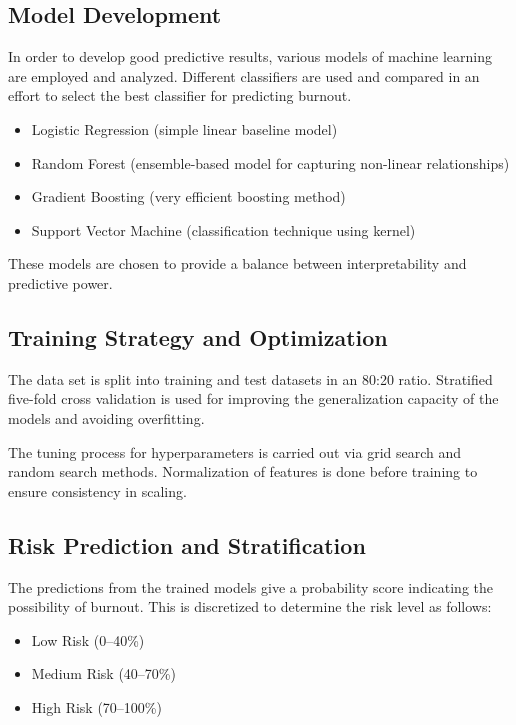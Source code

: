 \subsection{Model Development}

In order to develop good predictive results, various models of machine learning are employed and analyzed. Different classifiers are used and compared in an effort to select the best classifier for predicting burnout.

\begin{itemize}
    \item Logistic Regression (simple linear baseline model)
    \item Random Forest (ensemble-based model for capturing non-linear relationships)
    \item Gradient Boosting (very efficient boosting method)
    \item Support Vector Machine (classification technique using kernel)
\end{itemize}
These models are chosen to provide a balance between interpretability and predictive power.

\subsection{Training Strategy and Optimization}

The data set is split into training and test datasets in an 80:20 ratio. Stratified five-fold cross validation is used for improving the generalization capacity of the models and avoiding overfitting.

The tuning process for hyperparameters is carried out via grid search and random search methods. Normalization of features is done before training to ensure consistency in scaling.

\subsection{Risk Prediction and Stratification}

The predictions from the trained models give a probability score indicating the possibility of burnout. This is discretized to determine the risk level as follows:

\begin{itemize}
    \item Low Risk (0--40\%)
    \item Medium Risk (40--70\%)
    \item High Risk (70--100\%)
\end{itemize}


